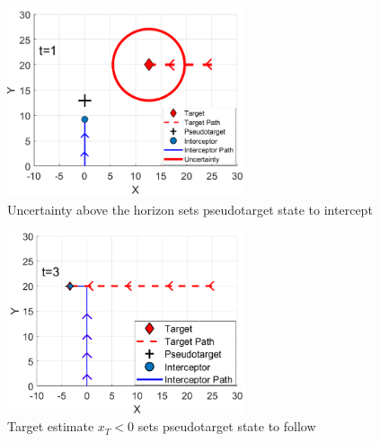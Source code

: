 \documentclass[conference]{IEEEtran}
\providecommand{\DIFaddbeginFL}{} %
\providecommand{\DIFaddendFL}{} %
\providecommand{\DIFdelbeginFL}{} %
\providecommand{\DIFdelendFL}{} %
\newcommand{\DIFscaledelfig}{0.5}
\newlength{\DIFdelgraphicswidth} %
\newlength{\DIFdelgraphicsheight} %
\newcommand{\DIFaddincludegraphics}[2][]{{\color{blue}\fbox{\DIFOincludegraphics[#1]{#2}}}} %
\newcommand{\DIFdelincludegraphics}[2][]{%
\sbox{\DIFdelgraphicsbox}{\DIFOincludegraphics[#1]{#2}}%
\settoboxwidth{\DIFdelgraphicswidth}{\DIFdelgraphicsbox} %
\settoboxtotalheight{\DIFdelgraphicsheight}{\DIFdelgraphicsbox} %
\scalebox{\DIFscaledelfig}{%
\parbox[b]{\DIFdelgraphicswidth}{\usebox{\DIFdelgraphicsbox}\\[-\baselineskip] \rule{\DIFdelgraphicswidth}{0em}}\llap{\resizebox{\DIFdelgraphicswidth}{\DIFdelgraphicsheight}{%
\setlength{\unitlength}{\DIFdelgraphicswidth}%
\begin{picture}(1,1)%
\thicklines\linethickness{2pt} %
{\color[rgb]{1,0,0}\put(0,0){\framebox(1,1){}}}%
{\color[rgb]{1,0,0}\put(0,0){\line( 1,1){1}}}%
{\color[rgb]{1,0,0}\put(0,1){\line(1,-1){1}}}%
\end{picture}%
}\hspace*{3pt}}} %
} %
\DeclareRobustCommand{\DIFaddbeginFL}{\DIFOaddbeginFL \let\includegraphics\DIFaddincludegraphics} %
\DeclareRobustCommand{\DIFaddendFL}{\DIFOaddendFL \let\includegraphics\DIFOincludegraphics} %
\DeclareRobustCommand{\DIFdelbeginFL}{\DIFOdelbeginFL \let\includegraphics\DIFdelincludegraphics} %
\DeclareRobustCommand{\DIFdelendFL}{\DIFOaddendFL \let\includegraphics\DIFOincludegraphics} %
\begin{document}
\begin{figure}[H]
	\centering
	\DIFdelbeginFL %
\DIFdelendFL \DIFaddbeginFL \includegraphics[width=7cm]{intercept}
	\DIFaddendFL \caption{Uncertainty above the horizon sets pseudotarget state to intercept}
	\label{fig:intercept}
\end{figure}

\begin{figure}[H]
	\centering
	\DIFdelbeginFL %
\DIFdelendFL \DIFaddbeginFL \includegraphics[width=7cm]{follow}
	\DIFaddendFL \caption{Target estimate $x_T < 0$ sets pseudotarget state to follow}
	\label{fig:follow}
\end{figure}


\end{document}
